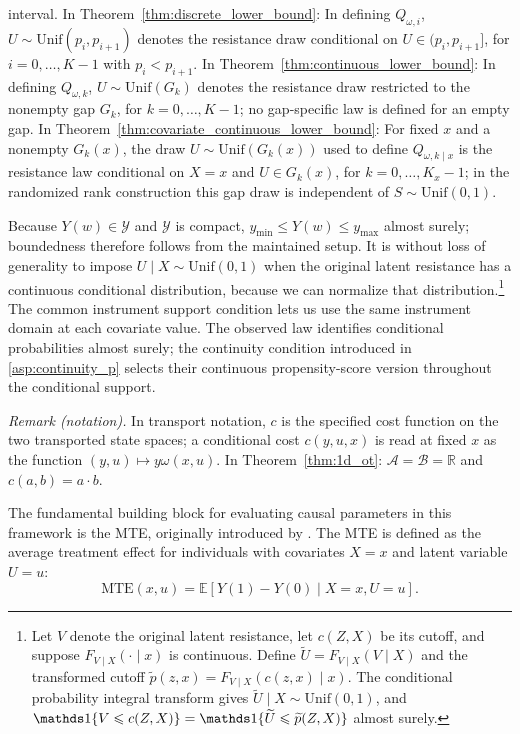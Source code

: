 interval. In Theorem~\ref{thm:discrete_lower_bound}: In defining $Q_{\omega,i}$, $U\sim\mathrm{Unif}(p_i,p_{i+1})$ denotes the resistance draw conditional on $U\in(p_i,p_{i+1}]$, for $i=0,\dots,K-1$ with $p_i<p_{i+1}$. In Theorem~\ref{thm:continuous_lower_bound}: In defining $Q_{\omega,k}$, $U\sim\mathrm{Unif}(G_k)$ denotes the resistance draw restricted to the nonempty gap $G_k$, for $k=0,\dots,K-1$; no gap-specific law is defined for an empty gap. In Theorem~\ref{thm:covariate_continuous_lower_bound}: For fixed $x$ and a nonempty $G_k(x)$, the draw $U\sim\mathrm{Unif}(G_k(x))$ used to define $Q_{\omega,k\mid x}$ is the resistance law conditional on $X=x$ and $U\in G_k(x)$, for $k=0,\dots,K_x-1$; in the randomized rank construction this gap draw is independent of $S\sim\mathrm{Unif}(0,1)$.


Because $Y(w)\in\mathcal Y$ and $\mathcal Y$ is compact, $y_{\min}\leqslant Y(w)\leqslant y_{\max}$ almost surely; boundedness therefore follows from the maintained setup. It is without loss of generality to impose $U\mid X\sim\text{Unif}(0,1)$ when the original latent resistance has a continuous conditional distribution, because we can normalize that distribution.\footnote{Let $V$ denote the original latent resistance, let $c(Z,X)$ be its cutoff, and suppose $F_{V\mid X}(\cdot\mid x)$ is continuous. Define $\tilde U=F_{V\mid X}(V\mid X)$ and the transformed cutoff $\tilde p(z,x)=F_{V\mid X}(c(z,x)\mid x)$. The conditional probability integral transform gives $\tilde U\mid X\sim\mathrm{Unif}(0,1)$, and $\indicator\{V\leqslant c(Z,X)\}=\indicator\{\tilde U\leqslant\tilde p(Z,X)\}$ almost surely.} The common instrument support condition lets us use the same instrument domain at each covariate value. The observed law identifies conditional probabilities almost surely; the continuity condition introduced in \cref{asp:continuity_p} selects their continuous propensity-score version throughout the conditional support.

\noindent\textit{Remark (notation).} In transport notation, $c$ is the specified cost function on the two transported state spaces; a conditional cost $c(y,u,x)$ is read at fixed $x$ as the function $(y,u)\mapsto y\omega(x,u)$. In Theorem~\ref{thm:1d_ot}: $\mathcal A=\mathcal B=\mathbb R$ and $c(a,b)=a\cdot b$.


The fundamental building block for evaluating causal parameters in this framework is the MTE, originally introduced by \citet{heckman1999local,heckman2005structural}. The MTE is defined as the average treatment effect for individuals with covariates $X=x$ and latent variable $U=u$:
\[ \text{MTE}(x,u) = \mathbb{E}[Y(1) - Y(0) \mid X=x, U=u]. \]

